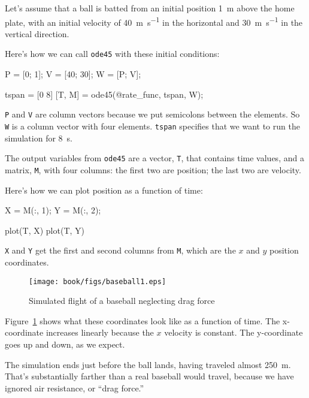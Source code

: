 Let's assume that a ball is batted from an initial position \SI{1}{\meter} above the home plate, with an initial velocity of \SI{40}{\meter\per\second} in the horizontal and \SI{30}{\meter\per\second} in the vertical direction.


Here's how we can call \lstinline{ode45} with these initial conditions:
 
\begin{code}
    P = [0; 1];       %
    V = [40; 30];     %
    W = [P; V];       %
    
    tspan = [0 8]
    [T, M] = ode45(@rate_func, tspan, W);
\end{code}

\lstinline{P} and \lstinline{V} are column vectors because we put semicolons between the elements.  
So \lstinline{W} is a column vector with four elements.
\lstinline{tspan} specifies that we want to run the simulation for \SI{8}{\second}.


The output variables from \lstinline{ode45} are a vector, 
\lstinline{T}, that contains time values, and a matrix, \lstinline{M}, with four columns: the first two are position; the last two are velocity.

Here's how we can plot position as a function of time:

\begin{code}
    X = M(:, 1);
    Y = M(:, 2);
    
    plot(T, X)
    plot(T, Y)
\end{code}

\lstinline{X} and \lstinline{Y} get the first and second columns from \lstinline{M}, which are the $x$ and $y$ position coordinates.

\begin{figure}[ht]
\centerline{\texttt{[image: book/figs/baseball1.eps]}}
\caption{Simulated flight of a baseball neglecting drag force}
\label{fig:baseball1}
\end{figure}

Figure~\ref{fig:baseball1} shows what these coordinates look like as a function of time.  The x-coordinate increases linearly because the $x$ velocity is constant.  The y-coordinate goes up and down, as we expect.

The simulation ends just before the ball lands, having traveled almost \SI{250}{\meter}.  That's substantially farther than a real baseball would travel, because we have ignored air resistance, or ``drag force.''


